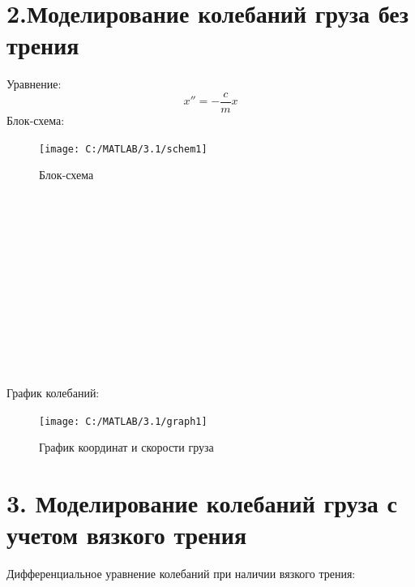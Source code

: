 \documentclass{article}
\begin{document}
	\section*{2.Моделирование колебаний груза без трения}
	Уравнение:
	$$x''=-\frac{c}{m}x$$
	Блок-схема:
	\begin{figure}[h!]
		\centering
		\texttt{[image: C:/MATLAB/3.1/schem1]}
		\caption{Блок-схема}

	\end{figure}
	~\\
	~\\\\
	~\\
	~\\\\
	~\\
	~\\\\~\\
	~\\\\
	График колебаний:
	\begin{figure}[H]
		\centering
		\texttt{[image: C:/MATLAB/3.1/graph1]}
		\caption{График координат и скорости груза}

	\end{figure}
	
	
	\section*{3. Моделирование колебаний груза с учетом вязкого трения}
	Дифференциальное уравнение колебаний при наличии вязкого трения:
\end{document}

